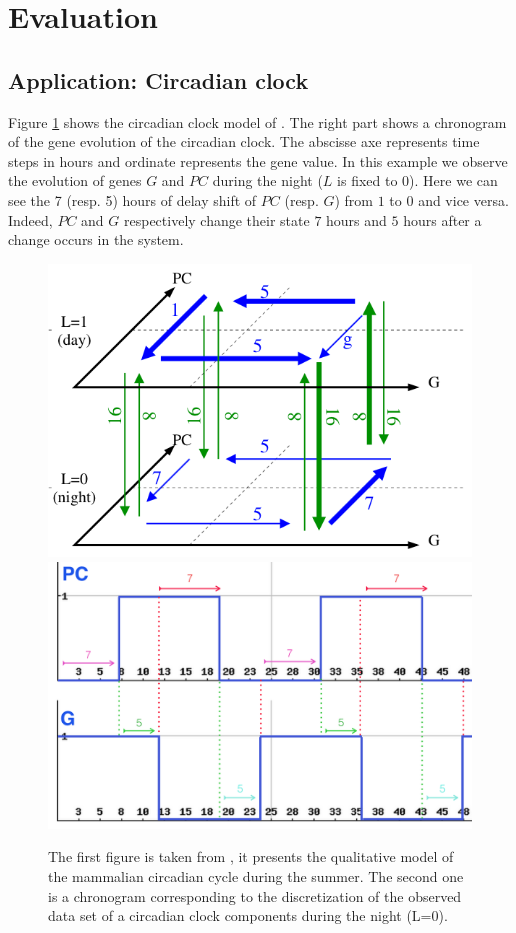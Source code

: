\section{Evaluation}
\label{sec:evaluation}
\subsection{Application: Circadian clock}

Figure \ref{fig:circadian_clock} shows the circadian clock model of \cite{comet2012simplified}.
The right part shows a chronogram of the gene evolution of the circadian clock.
The abscisse axe represents time steps in hours and ordinate represents the gene value.
In this example we observe the evolution of genes $G$ and $PC$ during the night ($L$ is fixed to 0).
Here we can see the 7 (resp. 5) hours of delay shift of $PC$ (resp. $G$) from $1$ to $0$ and vice versa.
Indeed, $PC$ and $G$ respectively change their state $7$ hours and $5$ hours after a change occurs in the system.

\begin{figure}[tb]
\begin{center}
\includegraphics[width=0.4\linewidth]{images/circadianClock-summer.png}
\includegraphics[width=0.4\linewidth]{images/circadianClock-Courb.png}
\end{center}
\caption{The first figure is taken from \cite{comet2010formal}, it presents the qualitative model of the mammalian circadian cycle during the summer. The second one is a chronogram corresponding to the discretization of the observed data set of a circadian clock components during the night (L=0).}
\label{fig:circadian_clock}
\end{figure}

